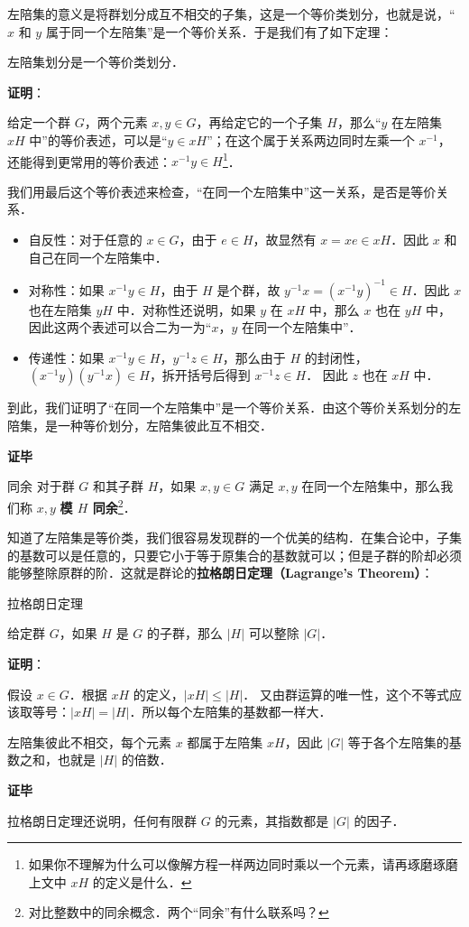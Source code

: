 左陪集的意义是将群划分成互不相交的子集，这是一个等价类划分，也就是说，“$x$ 和 $y$ 属于同一个左陪集”是一个等价关系．于是我们有了如下定理： 

\begin{theorem}{}\label{coset_the1}

左陪集划分是一个等价类划分．

\end{theorem}

\textbf{证明}：

给定一个群 $G$，两个元素 $x, y\in G$，再给定它的一个子集 $H$，那么“$y$ 在左陪集 $xH$ 中”的等价表述，可以是“$y\in xH$”；在这个属于关系两边同时左乘一个 $x^{-1}$，还能得到更常用的等价表述：$x^{-1}y\in H$\footnote{如果你不理解为什么可以像解方程一样两边同时乘以一个元素，请再琢磨琢磨上文中 $xH$ 的定义是什么．}．

我们用最后这个等价表述来检查，“在同一个左陪集中”这一关系，是否是等价关系．
\begin{itemize}
\item 自反性：对于任意的 $x\in G$，由于 $e\in H$，故显然有 $x=xe\in xH$．因此 $x$ 和自己在同一个左陪集中．
\item 对称性：如果 $x^{-1}y\in H$，由于 $H$ 是个群，故 $y^{-1}x=(x^{-1}y)^{-1}\in H$．因此 $x$ 也在左陪集 $yH$ 中．对称性还说明，如果 $y$ 在 $xH$ 中，那么 $x$ 也在 $yH$ 中，因此这两个表述可以合二为一为“$x$，$y$ 在同一个左陪集中”．
\item 传递性：如果 $x^{-1}y\in H$，$y^{-1}z\in H$，那么由于 $H$ 的封闭性，$(x^{-1}y)(y^{-1}x)\in H$，拆开括号后得到 $x^{-1}z\in H$． 因此 $z$ 也在 $xH$ 中．
\end{itemize}

到此，我们证明了“在同一个左陪集中”是一个等价关系．由这个等价关系划分的左陪集，是一种等价划分，左陪集彼此互不相交．

\textbf{证毕}

\begin{definition}{同余}
对于群 $G$ 和其子群 $H$，如果 $x, y\in G$ 满足 $x, y$ 在同一个左陪集中，那么我们称 $x, y$ \textbf{模 $H$ 同余}\footnote{对比整数中的同余概念．两个“同余”有什么联系吗？}．
\end{definition}

知道了左陪集是等价类，我们很容易发现群的一个优美的结构．在集合论中，子集的基数可以是任意的，只要它小于等于原集合的基数就可以；但是子群的阶却必须能够整除原群的阶．这就是群论的\textbf{拉格朗日定理（Lagrange's Theorem）}：

\begin{theorem}{拉格朗日定理}\label{coset_the2}

给定群 $G$，如果 $H$ 是 $G$ 的子群，那么 $|H|$ 可以整除 $|G|$．

\end{theorem}

\textbf{证明}：

假设 $x\in G$．根据 $xH$ 的定义，$|xH|\leq|H|$． 又由群运算的唯一性，这个不等式应该取等号：$|xH|=|H|$．所以每个左陪集的基数都一样大．

左陪集彼此不相交，每个元素 $x$ 都属于左陪集 $xH$，因此 $|G|$ 等于各个左陪集的基数之和，也就是 $|H|$ 的倍数．

\textbf{证毕}

拉格朗日定理还说明，任何有限群 $G$ 的元素，其指数都是 $|G|$ 的因子．
